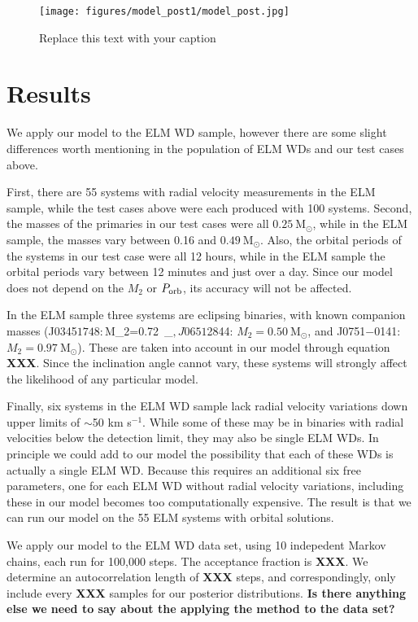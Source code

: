 \documentclass[letterpaper,12pt,preprint]{aastex}
\newcommand{\Msun}{\mathrm{M}_\odot}
\begin{document}
\begin{figure}[h!]
\begin{center}
\texttt{[image: figures/model\_post1/model\_post.jpg]}
\caption{Replace this text with your caption}
\end{center}
\end{figure}

\section{Results}

We apply our model to the ELM WD sample, however there are some slight differences worth mentioning in the population of ELM WDs and our test cases above. 

First, there are 55 systems with radial velocity measurements in the ELM sample, while the test cases above were each produced with 100 systems. Second, the masses of the primaries in our test cases were all $0.25~\Msun$, while in the ELM sample, the masses vary between 0.16 and $0.49~\Msun$. Also, the orbital periods of the systems in our test case were all 12 hours, while in the ELM sample the orbital periods vary between 12 minutes and just over a day. Since our model does not depend on the $M_2$ or $P_{\rm orb}$, its accuracy will not be affected. 

In the ELM sample three systems are eclipsing binaries, with known companion masses (J0345$1748: $M_2=0.72~\Msun$, J0651$2844: $M_2=0.50~\Msun$, and J0751$-$0141: $M_2=0.97~\Msun$). These are taken into account in our model through equation {\bf XXX}. Since the inclination angle cannot vary, these systems will strongly affect the likelihood of any particular model. 

Finally, six systems in the ELM WD sample lack radial velocity variations down upper limits of $\sim$50 km s$^{-1}$. While some of these may be in binaries with radial velocities below the detection limit, they may also be single ELM WDs. In principle we could add to our model the possibility that each of these WDs is actually a single ELM WD. Because this requires an additional six free parameters, one for each ELM WD without radial velocity variations, including these in our model becomes too computationally expensive. The result is that we can run our model on the 55 ELM systems with orbital solutions.


We apply our model to the ELM WD data set, using 10 indepedent Markov chains, each run for 100,000 steps. The acceptance fraction is {\bf XXX}. We determine an autocorrelation length of {\bf XXX} steps, and correspondingly, only include every {\bf XXX} samples for our posterior distributions. {\bf Is there anything else we need to say about the applying the method to the data set?}
\end{document}
